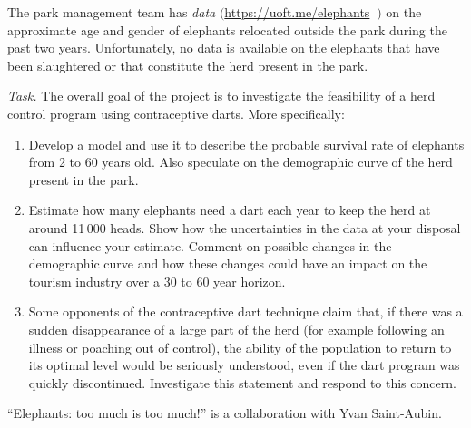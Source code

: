 The park management team has \emph{data} $\bigg($\url{https://uoft.me/elephants}  $\ \bigg)$ on the approximate age and gender of elephants relocated outside the park during the past two years. 
Unfortunately, no data is available on the elephants that have been slaughtered or that constitute the herd present in the park. 

\emph{Task.} The overall goal of the project is to investigate the feasibility of a herd control program using contraceptive darts. 
More specifically:

\begin{enumerate}[label=\emph{\arabic*.}]
	\item Develop a model and use it to describe the probable survival rate of elephants from 2 to 60 years old. Also speculate on the demographic curve of the herd present in the park.

	\item Estimate how many elephants need a dart each year to keep the herd at around 11\,000 heads. Show how the uncertainties in the data at your disposal can influence your estimate. Comment on possible changes in the demographic curve and how these changes could have an impact on the tourism industry over a 30 to 60 year horizon.

	\item Some opponents of the contraceptive dart technique claim that, if there was a sudden disappearance of a large part of the herd (for example following an illness or poaching out of control), the ability of the population to return to its optimal level would be seriously understood, even if the dart program was quickly discontinued. Investigate this statement and respond to this concern.

\end{enumerate}



%
%



\vfill

\hfill ``Elephants: too much is too much!'' is a collaboration with Yvan Saint-Aubin.


\begin{noexercises}
\end{noexercises}

